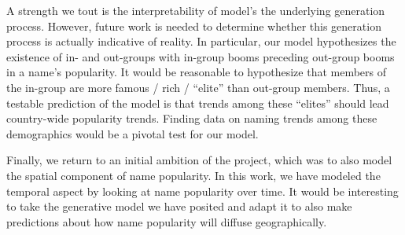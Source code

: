 \documentclass[a4paper]{article}
\begin{document}
A strength we tout is the interpretability of model's the underlying generation
process. However, future work is needed to determine whether this generation
process is actually indicative of reality. In particular, our model hypothesizes
the existence of in- and out-groups with in-group booms preceding out-group
booms in a name's popularity. It would be reasonable to hypothesize that members
of the in-group are more famous / rich / ``elite'' than out-group members. Thus,
a testable prediction of the model is that trends among these ``elites'' should
lead country-wide popularity trends. Finding data on naming trends among these
demographics would be a pivotal test for our model.

Finally, we return to an initial ambition of the project, which was to also
model the spatial component of name popularity. In this work, we have modeled
the temporal aspect by looking at name popularity over time. It would be
interesting to take the generative model we have posited and adapt it to also
make predictions about how name popularity will diffuse geographically.






\end{document}
